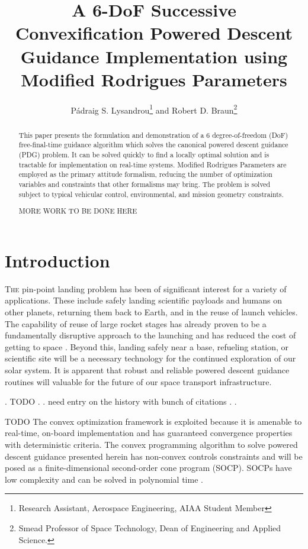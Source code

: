 \documentclass[conf]{new-aiaa}
\title{A 6-DoF Successive Convexification Powered Descent Guidance Implementation using Modified Rodrigues Parameters}
\author{Pádraig S. Lysandrou\footnote{Research Assistant, Aerospace Engineering, AIAA Student Member} and Robert D. Braun\footnote{Smead Professor of Space Technology, Dean of Engineering and Applied Science.}}
\affil{University of Colorado Boulder, Boulder, CO 80309}
\begin{document}
\maketitle

\begin{abstract}
	This paper presents the formulation and demonstration of a 6 degree-of-freedom (DoF) free-final-time guidance algorithm which solves the canonical powered descent guidance (PDG) problem. It can be solved quickly to find a locally optimal solution and is tractable for implementation on real-time systems. Modified Rodrigues Parameters are employed as the primary attitude formalism, reducing the number of optimization variables and constraints that other formalisms may bring. The problem is solved subject to typical vehicular control, environmental, and mission geometry constraints.




	MORE WORK TO BE DONE HERE
\end{abstract}


\section{Introduction}
\lettrine{T}{he} pin-point landing problem has been of significant interest for a variety of applications. These include safely landing scientific payloads and humans on other planets, returning them back to Earth, and in the reuse of launch vehicles. The capability of reuse of large rocket stages has already proven to be a fundamentally disruptive approach to the launching and has reduced the cost of getting to space \cite{jones2018recent}. Beyond this, landing safely near a base, refueling station, or scientific site will be a necessary technology for the continued exploration of our solar system. It is apparent that robust and reliable powered descent guidance routines will valuable for the future of our space transport infrastructure.

. TODO
.
. need entry on the history with bunch of citations
.
.

TODO
The convex optimization framework is exploited because it is amenable to real-time, on-board implementation and has guaranteed convergence properties with deterministic criteria. The convex programming algorithm to solve powered descent guidance presented herein has non-convex controls constraints and will be posed as a finite-dimensional second-order cone program (SOCP). SOCPs have low complexity and can be solved in polynomial time \cite{boyd2004convex}.
\end{document}
